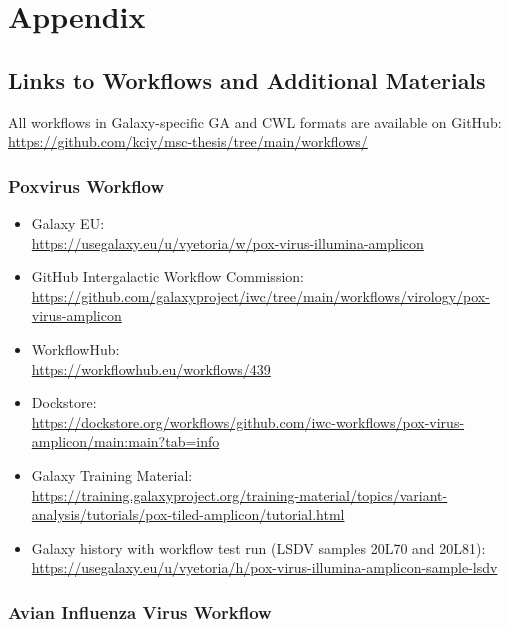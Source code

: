 \chapter*{Appendix}
\label{chap:appendix}

\vspace*{-16pt}
\section*{\thesection \quad Links to Workflows and Additional Materials}
\hspace*{-18pt}All workflows in Galaxy-specific GA and CWL formats are available on GitHub:\\
\url{https://github.com/kciy/msc-thesis/tree/main/workflows/}

\subsection*{\thesubsection \quad Poxvirus Workflow}
\label{sec:apx-pox-links}

\begin{itemize}
	\setlength{\itemsep}{-0.4cm}
	\item Galaxy EU:\\
	\url{https://usegalaxy.eu/u/vyetoria/w/pox-virus-illumina-amplicon}
	\item GitHub Intergalactic Workflow Commission:\\
	\url{https://github.com/galaxyproject/iwc/tree/main/workflows/virology/pox-virus-amplicon}
	\item WorkflowHub:\\
	\url{https://workflowhub.eu/workflows/439}
	\item Dockstore:\\
	\url{https://dockstore.org/workflows/github.com/iwc-workflows/pox-virus-amplicon/main:main?tab=info}
	\item Galaxy Training Material:\\
	\url{https://training.galaxyproject.org/training-material/topics/variant-analysis/tutorials/pox-tiled-amplicon/tutorial.html}
	\item Galaxy history with workflow test run (\ac{LSDV} samples 20L70 and 20L81):\\
	\url{https://usegalaxy.eu/u/vyetoria/h/pox-virus-illumina-amplicon-sample-lsdv} 
\end{itemize}

\subsection*{\thesubsection \quad Avian Influenza Virus Workflow}
\label{sec:apx-aiv-links}

